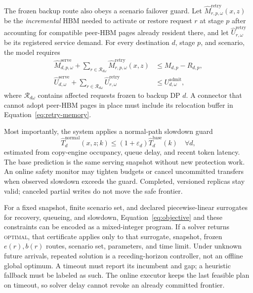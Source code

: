 The frozen backup route also obeys a scenario failover guard.  Let
$\widehat M^{\mathrm{retry}}_{r,p,\omega}(x,z)$ be the \emph{incremental} HBM
needed to activate or restore request $r$ at stage $p$ after accounting for
compatible peer-HBM pages already resident there, and let
$\widehat U^{\mathrm{retry}}_{r,\omega}$ be its registered service demand.  For
every destination $d$, stage $p$, and scenario, the model requires
\begin{align}
  \widehat M^{\mathrm{serve}}_{d,p,\omega}
    +\sum_{r\in\mathcal R_{d\omega}}
       \widehat M^{\mathrm{retry}}_{r,p,\omega}(x,z)
    &\le M_{d,p}-R_{d,p}, \label{eq:retry-memory}\\
  \widehat U^{\mathrm{serve}}_{d,\omega}
    +\sum_{r\in\mathcal R_{d\omega}}
       \widehat U^{\mathrm{retry}}_{r,\omega}
    &\le U^{\mathrm{admit}}_{d,\omega},
    \label{eq:retry-service}
\end{align}
where $\mathcal R_{d\omega}$ contains affected requests frozen to backup DP
$d$.  A connector that cannot adopt peer-HBM pages in place must include its
relocation buffer in Equation~\ref{eq:retry-memory}.

Most importantly, the system applies a normal-path slowdown guard
\begin{equation}
  \widehat T^{\mathrm{normal}}_d(x,z;k)
    \le (1+\varepsilon_d)\widehat T^{\mathrm{base}}_d(k)
  \quad\forall d,
  \label{eq:slowdown-guard}
\end{equation}
estimated from copy-engine occupancy, queue delay, and recent token latency.
The base prediction is the same serving snapshot without new protection work.
An online safety monitor may tighten budgets or cancel uncommitted transfers
when observed slowdown exceeds the guard.  Completed, versioned replicas stay
valid; canceled partial writes do not move the safe frontier.

For a fixed snapshot, finite scenario set, and declared piecewise-linear
surrogates for recovery, queueing, and slowdown, Equation~\ref{eq:objective}
and these constraints can be encoded as a mixed-integer program.  If a solver
returns \textsc{optimal}, that certificate applies only to that surrogate,
snapshot, frozen $e(r),b(r)$ routes, scenario set, parameters, and time limit.
Under unknown future
arrivals, repeated solution is a receding-horizon controller, not an offline
global optimum.  A timeout must report its incumbent and gap; a heuristic
fallback must be labeled as such.  The online executor keeps the last feasible
plan on timeout, so solver delay cannot revoke an already committed frontier.

